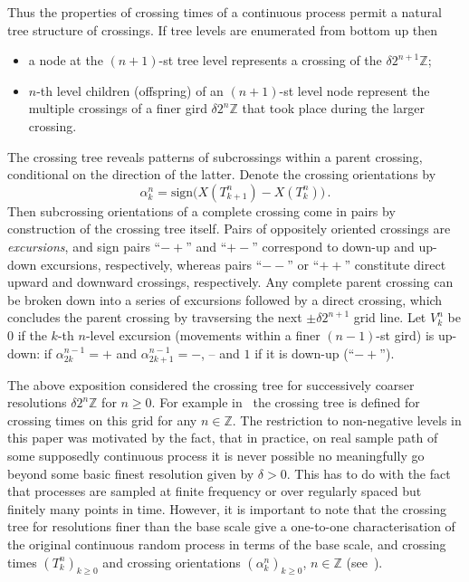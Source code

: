 Thus the properties of crossing times of a continuous process permit a natural tree
structure of crossings. If tree levels are enumerated from bottom up then \begin{itemize}
	\item a node at the $(n+1)$-st tree level represents a crossing of the $\delta 2^{n+1} \mathbb{Z}$;
	\item $n$-th level children (offspring) of an $(n+1)$-st level node represent the
	multiple crossings of a finer gird $\delta 2^n \mathbb{Z}$ that took place during
	the larger crossing. 
\end{itemize}

The crossing tree reveals patterns of subcrossings within a parent crossing,
conditional on the direction of the latter. Denote the crossing orientations by
\[ \alpha_k^n = \text{sign}\bigl( X(T_{k+1}^n) - X(T_k^n)\bigr) \,. \]
Then subcrossing orientations of a complete crossing come in pairs by construction
of the crossing tree itself. Pairs of oppositely oriented crossings are
\emph{excursions}, and sign pairs ``$-+$'' and ``$+-$'' correspond to down-up
and up-down excursions, respectively, whereas pairs ``$--$'' or ``$++$'' constitute
direct upward and downward crossings, respectively. Any complete parent crossing
can be broken down into a series of excursions followed by a direct crossing, which
concludes the parent crossing by travsersing the next $\pm\delta 2^{n+1}$ grid line.
Let $V_k^n$ be $0$ if the $k$-th $n$-level excursion (movements within a finer $(n-1)$-st
gird) is up-down: if $\alpha_{2k}^{n-1} = +$ and $\alpha_{2k+1}^{n-1} = -$, --
and $1$ if it is down-up (``$-+$'').

The above exposition considered the crossing tree for successively coarser resolutions
$\delta 2^n \mathbb{Z}$ for $n\geq0$. For example in~\cite{decrouez2013estimation}
the crossing tree is defined for crossing times on this grid for any $n\in\mathbb{Z}$.
The restriction to non-negative levels in this paper was motivated by the fact,
that in practice, on real sample path of some supposedly continuous process it
is never possible no meaningfully go beyond some basic finest resolution given
by $\delta>0$. This has to do with the fact that processes are sampled at finite
frequency or over regularly spaced but finitely many points in time. However, it
is important to note that the crossing tree for resolutions finer than the base
scale give a one-to-one characterisation of the original continuous random process
in terms of the base scale, and crossing times $(T_k^n)_{k\geq 0}$ and crossing
orientations $(\alpha_k^n)_{k\geq 0}$, $n\in \mathbb{Z}$ (see~\cite{decrouez2013estimation, ECP1673}).

